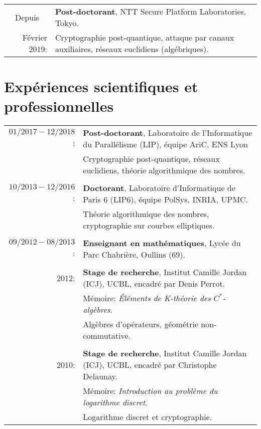 \documentclass[11pt]{article}
\begin{document}
\hspace{-0.6cm} \begin{tabular}{rl}
Depuis~~  & \textbf{Post-doctorant}, NTT Secure Platform Laboratories, Tokyo.\\
                  Février 2019:  & Cryptographie post-quantique, attaque par canaux auxiliaires, réseaux euclidiens (algébriques).
\end{tabular}

\smallskip
\section{Expériences scientifiques et professionnelles}
\hspace{-0.9cm} \begin{tabular}{rl}
                  $01/2017 -12/2018$: & \textbf{Post-doctorant}, Laboratoire de l'Informatique du Parallélisme (LIP), équipe AriC, ENS Lyon\\
                  & Cryptographie post-quantique, réseaux euclidiens, théorie algorithmique des nombres.\\
          &\\
                  $10/2013-12/2016$: & \textbf{Doctorant}, Laboratoire d'Informatique de Paris 6 (LIP6), équipe PolSys, INRIA, UPMC.\\
          & Théorie algorithmique des nombres, cryptographie sur courbes elliptiques.\\
          &\\
                  $09/2012-08/2013$: & \textbf{Enseignant en mathématiques}, Lycée du Parc Chabrière, Oullins (69).\\
          &\\
                 2012: & \textbf{Stage de recherche}, Institut Camille Jordan (ICJ), UCBL, encadré par Denis Perrot.\\
                                   & Mémoire: {\em \'Eléments de K-théorie des $C^*$-algèbres}.\\
          & Algèbres d'opérateurs, géométrie non-commutative.\\
                                 &\\
                 2010: & \textbf{Stage de recherche}, Institut Camille Jordan (ICJ), UCBL, encadré par Christophe Delaunay.\\
                                  & Mémoire: {\em Introduction au problème du logarithme discret}.\\
          & Logarithme discret et cryptographie.
\end{tabular}
\end{document}
